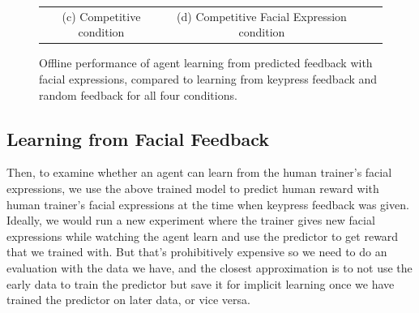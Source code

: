 \documentclass[10pt,journal,compsoc]{IEEEtran}
\begin{document}
\begin{figure}[htb]
\begin{tabular}{c c c c}
(c) Competitive condition & (d) Competitive Facial Expression condition
\end{tabular}
\caption{Offline performance of agent learning from predicted feedback with facial expressions, compared to learning from keypress feedback and random feedback for all four conditions. }%
\label{learning_from_predicted}
\end{figure}

\subsection{Learning from Facial Feedback}

Then, to examine whether an agent can learn from the human trainer's facial expressions, we use the above trained model to predict human reward with human trainer's facial expressions at the time when keypress feedback was given. Ideally, we would run a new experiment where the trainer gives new facial expressions while watching the agent learn and use the predictor to get reward that we trained with. But that's prohibitively expensive so we need to do an evaluation with the data we have, and the closest approximation is to not use the early data to train the predictor but save it for implicit learning once we have trained the predictor on later data, or vice versa. 
\end{document}
